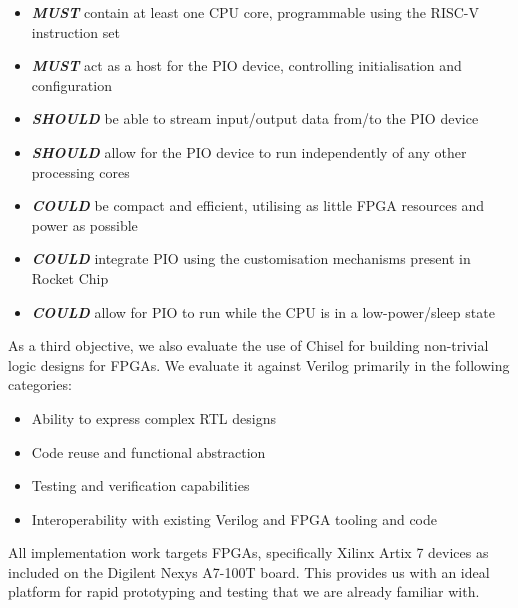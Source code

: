 \begin{itemize}
    \item \textit{\textbf{MUST}} contain at least one CPU core, programmable using the RISC-V instruction set
    \item \textit{\textbf{MUST}} act as a host for the PIO device, controlling initialisation and configuration
    \item \textit{\textbf{SHOULD}} be able to stream input/output data from/to the PIO device
    \item \textit{\textbf{SHOULD}} allow for the PIO device to run independently of any other processing cores
    \item \textit{\textbf{COULD}} be compact and efficient, utilising as little FPGA resources and power as possible
    \item \textit{\textbf{COULD}} integrate PIO using the customisation mechanisms present in Rocket Chip
    \item \textit{\textbf{COULD}} allow for PIO to run while the CPU is in a low-power/sleep state
\end{itemize}

As a third objective, we also evaluate the use of Chisel for building non-trivial logic designs for FPGAs. We evaluate it against Verilog primarily in the following categories:

\begin{itemize}
    \item Ability to express complex RTL designs
    \item Code reuse and functional abstraction
    \item Testing and verification capabilities
    \item Interoperability with existing Verilog and FPGA tooling and code
\end{itemize}

All implementation work targets FPGAs, specifically Xilinx Artix 7 devices as included on the Digilent Nexys A7-100T board. This provides us with an ideal platform for rapid prototyping and testing that we are already familiar with.
